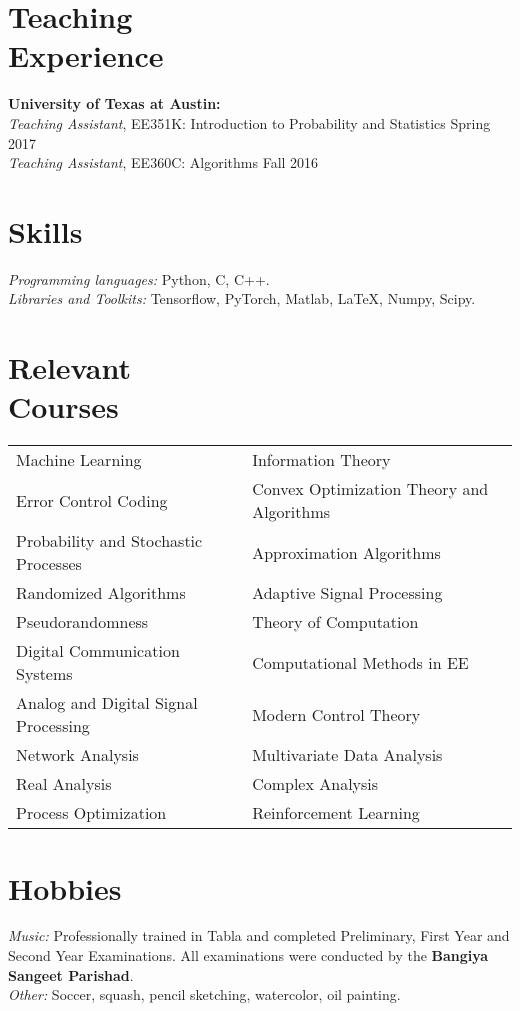 \documentclass[margin, 11pt]{res} %
\begin{document}
\begin{resume}
\section{\large Teaching \\ Experience}
{\bf University of Texas at Austin:}\\
{\sl Teaching Assistant}, EE351K: Introduction to Probability and Statistics \hfill Spring 2017\\
{\sl Teaching Assistant}, EE360C: Algorithms \hfill Fall 2016

\section{\large Skills}
{\sl Programming languages:} Python, C, C++.\\
{\sl Libraries and Toolkits:} Tensorflow, PyTorch, Matlab, \LaTeX, Numpy, Scipy.

\section{\large Relevant \\ Courses}

\setlength\tabcolsep{15pt}
\begin{tabular}{ll}
	Machine Learning & Information Theory \\
	Error Control Coding & Convex Optimization Theory and Algorithms\\
	Probability and Stochastic Processes & Approximation Algorithms \\ 
	Randomized Algorithms & Adaptive Signal Processing \\
	Pseudorandomness & Theory of Computation \\
	Digital Communication Systems & Computational Methods in EE \\ 
	Analog and Digital Signal Processing & Modern Control Theory\\
	Network Analysis & Multivariate Data Analysis\\
	Real Analysis & Complex Analysis\\
	Process Optimization & Reinforcement Learning\\
\end{tabular}

\section{Hobbies}
{\sl Music:} Professionally trained in Tabla and completed Preliminary, First Year and Second Year Examinations. All examinations were conducted by the {\bf Bangiya Sangeet Parishad}.\\
{\sl Other:} Soccer, squash, pencil sketching, watercolor, oil painting.


\end{resume}
\end{document}
